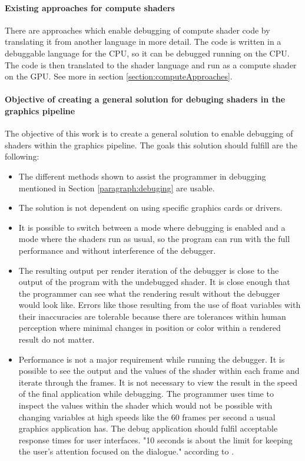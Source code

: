 \paragraph{Existing approaches for compute shaders}

There are approaches which enable debugging of compute shader code by translating it from another language in more detail. The code is written in a debuggable language for the CPU, so it can be debugged running on the CPU. The code is then translated to the shader language and run as a compute shader on the GPU.
See more in section \ref{section:computeApproaches}.

\paragraph{Objective of creating a general solution for debuging shaders in the graphics pipeline}

The objective of this work is to create a general solution to enable debugging of shaders within the graphics pipeline. The goals this solution should fulfill are the following:

\begin{itemize}
	\item The different methods shown to assist the programmer in debugging mentioned in Section \ref{paragraph:debuging} are usable.
	\item The solution is not dependent on using specific graphics cards or drivers.
	\item It is possible to switch between a mode where debugging is enabled and a mode where the shaders run as usual, so the program can run with the full performance and without interference of the debugger.
	\item The resulting output per render iteration of the debugger is close to the output of the program with the undebugged shader. It is close enough that the programmer can see what the rendering result without the debugger would look like. Errors like those resulting from the use of float variables with their inaccuracies are tolerable because there are tolerances within human perception where minimal changes in position or color within a rendered result do not matter.
	\item Performance is not a major requirement while running the debugger. It is possible to see the output and the values of the shader within each frame and iterate through the frames. It is not necessary to view the result in the speed of the final application while debugging. The programmer uses time to inspect the values within the shader which would not be possible with changing variables at high speeds like the 60 frames per second a usual graphics application has. The debug application should fulfil acceptable response times for user interfaces. "10 seconds is about the limit for keeping the user's attention focused on the dialogue." according to .
\end{itemize}




